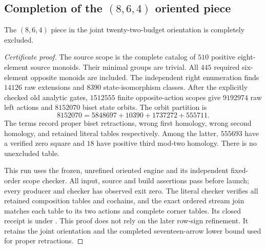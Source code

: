 \subsection{Completion of the $(8,6,4)$ oriented piece}

\begin{proposition}
\label{CP2:A-oriented-eighteen-eight-six-four}
The $(8,6,4)$ piece in the joint twenty-two-budget
orientation is completely excluded.
\end{proposition}
\begin{proof}[Certificate proof]
The source scope is the complete catalog of $510$
positive eight-element source monoids.  Their minimal
groups are trivial.  All $445$ required six-element
opposite monoids are included.  The independent right
enumeration finds $14126$ raw extensions and $8390$
state-isomorphism classes.  After the explicitly checked
old analytic gates, $1512555$ finite opposite-action
scopes give $9192974$ raw left actions and $8152070$
biset state orbits.  The orbit partition is
\[
 8152070=5848697+10390+1737272+555711.
\]
The terms record proper biset retractions, wrong first
homology, wrong second homology, and retained literal
tables respectively.  Among the latter, $555693$ have
a verified zero square and $18$ have positive third
mod-two homology.  There is no unexcluded table.

This run uses the frozen, unrefined oriented engine and
its independent fixed-order scope checker.  All input,
source and build assertions pass before launch; every
producer and checker has observed exit zero.  The
literal checker verifies all retained composition tables
and cochains, and the exact ordered stream join matches
each table to its two actions and complete corner
tables.  Its closed receipt is
 under
.
This proof does not rely on the later row-sign refinement.
It retains the joint orientation and the completed
seventeen-arrow lower bound used for proper retractions.
\end{proof}
